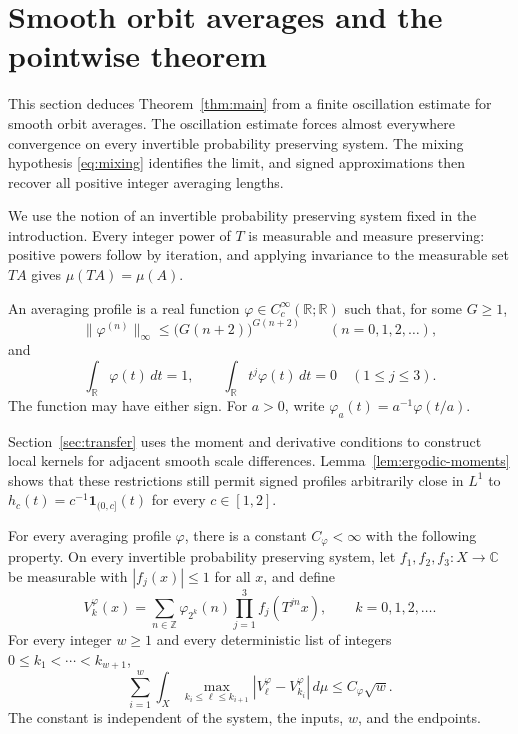 \section{Smooth orbit averages and the pointwise theorem}
\label{sec:ergodic}

This section deduces Theorem~\ref{thm:main} from a finite oscillation
estimate for smooth orbit averages.  The oscillation estimate forces
almost everywhere convergence on every invertible probability preserving
system.  The mixing hypothesis \eqref{eq:mixing} identifies the limit, and
signed approximations then recover all positive integer averaging lengths.

We use the notion of an invertible probability preserving system fixed in
the introduction.  Every integer power of \(T\) is measurable and measure
preserving: positive powers follow by iteration, and applying invariance to
the measurable set \(TA\) gives \(\mu(TA)=\mu(A)\).

\begin{definition}
\label{def:averaging-profile}
An averaging profile is a real function
\(\varphi\in C_c^\infty(\mathbb R;\mathbb R)\) such that, for some
\(G\geq1\),
\begin{equation}
 \|\varphi^{(n)}\|_\infty
   \leq\bigl(G(n+2)\bigr)^{G(n+2)}
       \qquad(n=0,1,2,\ldots),
 \label{eq:profile-derivatives}
\end{equation}
and
\begin{equation}
 \int_{\mathbb R}\varphi(t)\,dt=1,\qquad
 \int_{\mathbb R}t^j\varphi(t)\,dt=0\quad(1\leq j\leq3).
 \label{eq:profile-moments}
\end{equation}
The function may have either sign.  For \(a>0\), write
\(\varphi_a(t)=a^{-1}\varphi(t/a)\).
\end{definition}

Section~\ref{sec:transfer} uses the moment and derivative conditions to
construct local kernels for adjacent smooth scale differences.
Lemma~\ref{lem:ergodic-moments} shows that these restrictions still permit
signed profiles arbitrarily close in \(L^1\) to
\(h_c(t)=c^{-1}\mathbf1_{(0,c]}(t)\) for every \(c\in[1,2]\).

\begin{proposition}
\label{prop:orbit-oscillation}
For every averaging profile \(\varphi\), there is a constant
\(C_\varphi<\infty\) with the following property.  On every invertible
probability preserving system, let \(f_1,f_2,f_3:X\to\mathbb C\) be
measurable with \(|f_j(x)|\leq1\) for all \(x\), and define
\[
 V_k^\varphi(x)=\sum_{n\in\mathbb Z}\varphi_{2^k}(n)
                 \prod_{j=1}^3f_j(T^{jn}x),
       \qquad k=0,1,2,\ldots .
\]
For every integer \(w\geq1\) and every deterministic list of integers
\(0\leq k_1<\cdots<k_{w+1}\),
\begin{equation}
 \sum_{i=1}^w\int_X
   \max_{k_i\leq\ell\leq k_{i+1}}
      |V_\ell^\varphi-V_{k_i}^\varphi|\,d\mu
       \leq C_\varphi\sqrt w.
 \label{eq:orbit-oscillation}
\end{equation}
The constant is independent of the system, the inputs, \(w\), and the
endpoints.
\end{proposition}

